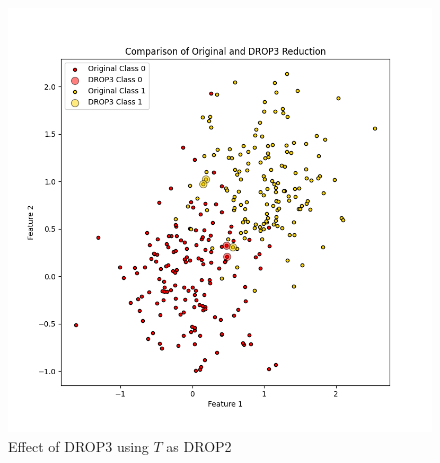 \begin{enumerate}
\begin{figure}[ht]
\begin{minipage}{0.45\textwidth}
			\includegraphics[width=\textwidth]{figures/DROP3Total} %
			\caption{Effect of DROP3 using $T$ as DROP2}
			\label{fig:DROp3Total}
		\end{minipage}
	\end{figure}
	
\end{enumerate}
